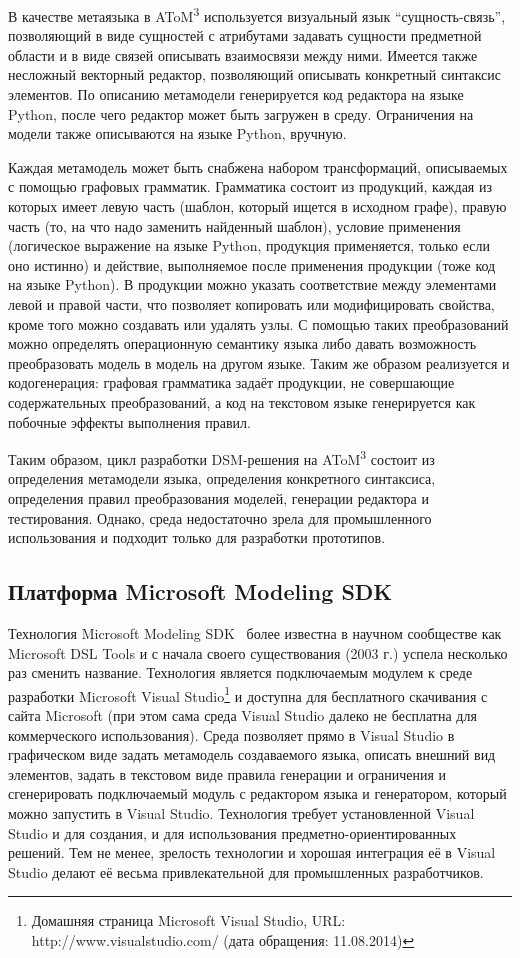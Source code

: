 В качестве метаязыка в AToM\textsuperscript{3} используется визуальный язык "`сущность-связь"', позволяющий в виде 
сущностей с атрибутами задавать сущности предметной области и в виде связей описывать 
взаимосвязи между ними. Имеется также несложный векторный редактор, позволяющий описывать 
конкретный синтаксис элементов. По описанию метамодели генерируется код редактора 
на языке Python, после чего редактор может быть загружен в среду. Ограничения на модели
также описываются на языке Python, вручную.

Каждая метамодель может быть снабжена набором трансформаций, описываемых с помощью 
графовых грамматик. Грамматика состоит из продукций, каждая из которых имеет левую 
часть (шаблон, который ищется в исходном графе), правую часть (то, на что надо заменить 
найденный шаблон), условие применения (логическое выражение на языке Python, продукция 
применяется, только если оно истинно) и действие, выполняемое после применения продукции 
(тоже код на языке Python). В продукции можно указать соответствие между элементами 
левой и правой части, что позволяет копировать или модифицировать свойства, кроме 
того можно создавать или удалять узлы. С помощью таких преобразований можно определять 
операционную семантику языка либо давать возможность преобразовать модель в модель 
на другом языке. Таким же образом реализуется и кодогенерация: графовая грамматика 
задаёт продукции, не совершающие содержательных преобразований, а код на текстовом 
языке генерируется как побочные эффекты выполнения правил.

Таким образом, цикл разработки DSM-решения на AToM\textsuperscript{3} состоит из определения метамодели 
языка, определения конкретного синтаксиса, определения правил преобразования моделей, 
генерации редактора и тестирования. Однако, среда недостаточно зрела для промышленного 
использования и подходит только для разработки прототипов.

\subsection{Платформа Microsoft Modeling SDK}
Технология Microsoft Modeling SDK~\cite{cook2007domain} более известна в научном сообществе как Microsoft DSL Tools
и с начала своего существования (2003 г.) успела несколько раз сменить название. Технология является
подключаемым модулем к среде разработки Microsoft Visual Studio\footnote
{Домашняя страница Microsoft Visual Studio, URL: http://www.visualstudio.com/ (дата обращения: 11.08.2014)}
и доступна для бесплатного скачивания с сайта Microsoft (при этом сама среда Visual Studio далеко не 
бесплатна для коммерческого использования). Среда позволяет прямо в Visual Studio
в графическом виде задать метамодель создаваемого языка, описать внешний вид элементов, 
задать в текстовом виде правила генерации и ограничения и сгенерировать подключаемый модуль с
редактором языка и генератором, который можно запустить в Visual Studio. Технология требует установленной 
Visual Studio и для создания, и для использования предметно-ориентированных решений.
Тем не менее, зрелость технологии и хорошая интеграция её в Visual Studio делают её
весьма привлекательной для промышленных разработчиков.

